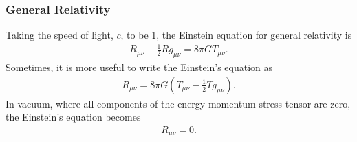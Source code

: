 \documentclass[a4paper,11pt]{article}
\numberwithin{equation}{section}
\theoremstyle{definition}
\begin{document}
\subsubsection{General Relativity}

Taking the speed of light, $c$, to be 1, the Einstein equation for general relativity is
\begin{align}
R_{\mu\nu} - \frac{1}{2}Rg_{\mu\nu} = 8\pi GT_{\mu\nu}.
\end{align}
Sometimes, it is more useful to write the Einstein's equation as
\begin{align}
R_{\mu\nu} = 8\pi G \left( T_{\mu\nu} - \frac{1}{2}Tg_{\mu\nu} \right).
\end{align}
In vacuum, where all components of the energy-momentum stress tensor are zero, the Einstein's equation becomes
\begin{align}
R_{\mu\nu} = 0.
\end{align}
\end{document}
